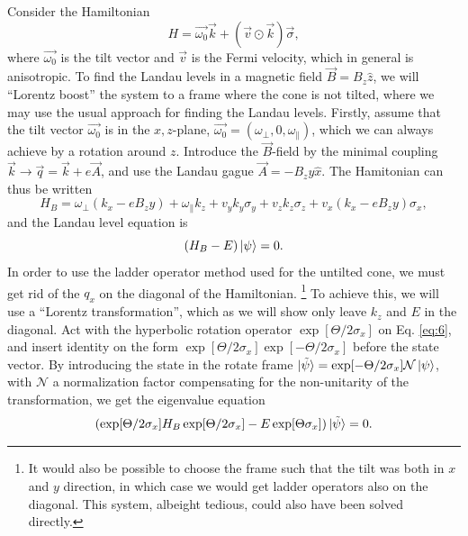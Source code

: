 Consider the Hamiltonian
\begin{equation}
  \label{eq:4}
  H = \vec{\omega_{0}} \vec{k} + (\vec{v} \odot \vec{k}) \vec{\sigma},
\end{equation}
where \(\vec{\omega_{0}}\) is the tilt vector and \(\vec{v}\) is the Fermi velocity, which in general is anisotropic.
To find the Landau levels in a magnetic field \(\vec{B} = B_{z}\hat{z} \), we will ``Lorentz boost'' the system to a frame where the cone is not tilted, where we may use the usual approach for finding the Landau levels.
Firstly, assume that the tilt vector \(\vec{\omega_{0}}\) is in the \(x,z\)-plane, \(\vec{\omega_{0}} = (\omega_{\perp}, 0, \omega_{\parallel})\), which we can always achieve by a rotation around \(z\).
Introduce the \(\vec{B}\)-field by the minimal coupling \(\vec{k} \to \vec{q} = \vec{k} + e \vec{A}\), and use the Landau gague \(\vec{A} = -B_{z}y \hat{x}\).
The Hamitonian can thus be written
\begin{equation}
  \label{eq:5}
  H_{B} = \omega _{\perp} \left(k_{x} - e B_{z} y \right) + \omega _{\parallel} k_{z} + v_{y} k_{y} \sigma _{y} + v_{z} k_{z} \sigma _{z} + v_{x} \left(k_{x} - e B_{z} y\right) \sigma _{x},
\end{equation}
and the Landau level equation is
\begin{equation}
  \label{eq:6}
  \left(H_{B} - E\right) \ket{\psi } = 0.
\end{equation}
In order to use the ladder operator method used for the untilted cone, we must get rid of the \(q_{x}\) on the diagonal of the Hamiltonian.
\footnote{It would also be possible to choose the frame such that the tilt was both in \(x\) and \(y\) direction, in which case we would get ladder operators also on the diagonal.
  This system, albeight tedious, could also have been solved directly.
}
To achieve this, we will use a ``Lorentz transformation'', which as we will show only leave \(k_{z}\) and \(E\) in the diagonal.
Act with the hyperbolic rotation operator \(\exp[\Theta /2 \sigma_{x}]\) on Eq. \eqref{eq:6}, and insert identity on the form \(\exp[\Theta /2 \sigma_{x}]\exp[-\Theta /2 \sigma_{x}]\) before the state vector.
By introducing the state in the rotate frame \(\ket{\tilde{\psi}} = \exp[- \Theta /2 \sigma_{x}] \mathcal{N} \ket{\psi } \), with \(\mathcal{N}\) a normalization factor compensating for the non-unitarity of the transformation, we get the eigenvalue equation
\begin{equation}
  \label{eq:7}
  (\exp[\Theta /2 \sigma_{x}] H_{B}\exp[\Theta /2 \sigma_{x}] - E \exp[\Theta \sigma_{x}]) \ket{\tilde{\psi}} = 0.
\end{equation}


